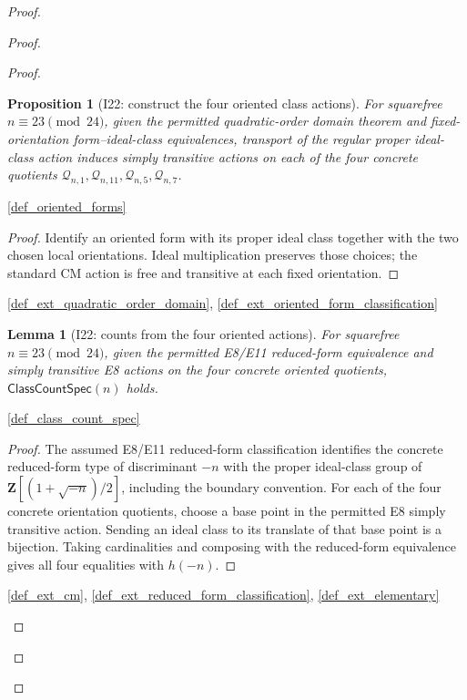 \documentclass[11pt,a4paper]{article}
\numberwithin{equation}{section}
\theoremstyle{plain}\newtheorem{theorem}{Theorem}[section]\newaliascnt{proposition}{theorem}\newtheorem{proposition}[proposition]{Proposition}\aliascntresetthe{proposition}\newaliascnt{lemma}{theorem}\newtheorem{lemma}[lemma]{Lemma}\aliascntresetthe{lemma}
\theoremstyle{definition}\newaliascnt{definition}{theorem}\newtheorem{definition}[definition]{Definition}\aliascntresetthe{definition}\newaliascnt{notation}{theorem}\newtheorem{notation}[notation]{Notation}\aliascntresetthe{notation}
\providecommand{\lean}[1]{}\providecommand{\leanok}{}
\begin{document}
\begin{proof}
\begin{proof}
\begin{proof}
\begin{proposition}[I22: construct the four oriented class actions]\label{prop_i22_oriented_actions}\lean{SptCM.CM.Repaired.fourOrientedIdealClassActions_of_E8}\leanok
For squarefree $n\equiv23\pmod{24}$, given the permitted quadratic-order
domain theorem and fixed-orientation form--ideal-class equivalences, transport
of the regular proper ideal-class action induces simply transitive actions on
each of the four concrete quotients
$\mathcal Q_{n,1},\mathcal Q_{n,11},\mathcal Q_{n,5},\mathcal Q_{n,7}$.
\end{proposition}
\begin{uses-statement}\ref{def_oriented_forms}\end{uses-statement}
\begin{proof}
Identify an oriented form with its proper ideal class together with the two
chosen local orientations.  Ideal multiplication preserves those choices;
the standard CM action is free and transitive at each fixed orientation.
\end{proof}
\begin{uses-proof}\ref{def_ext_quadratic_order_domain}, \ref{def_ext_oriented_form_classification}\end{uses-proof}

\begin{lemma}[I22: counts from the four oriented actions]\label{lem_i22_class_counts}\lean{SptCM.Arithmetic.Repaired.classCountSpec_of_E8}\leanok
For squarefree $n\equiv23\pmod{24}$, given the permitted E8/E11
reduced-form equivalence and simply transitive E8 actions on the four concrete
oriented quotients, $\mathsf{ClassCountSpec}(n)$ holds.
\end{lemma}
\begin{uses-statement}\ref{def_class_count_spec}\end{uses-statement}
\begin{proof}
The assumed E8/E11 reduced-form classification identifies the concrete
reduced-form type of discriminant $-n$ with the proper ideal-class group of
$\mathbf Z[(1+\sqrt{-n})/2]$, including the boundary convention.  For each of
the four concrete orientation quotients, choose a base point in the permitted
E8 simply transitive action.  Sending an ideal class to its translate of that
base point is a bijection.  Taking cardinalities and composing with the
reduced-form equivalence gives all four equalities with $h(-n)$.
\end{proof}
\begin{uses-proof}\ref{def_ext_cm}, \ref{def_ext_reduced_form_classification}, \ref{def_ext_elementary}\end{uses-proof}


\end{proof}
\end{proof}
\end{proof}
\end{document}

